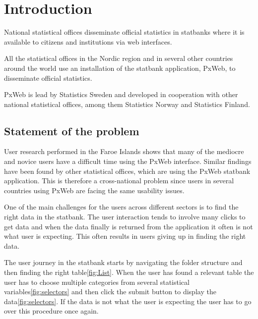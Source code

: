\chapter{Introduction}

National statistical offices disseminate official statistics in statbanks where it is available to citizens and institutions via web interfaces.
 
All the statistical offices in the Nordic region and in several other countries around the world use an installation of the statbank application, PxWeb, to disseminate official statistics.
 
PxWeb is lead by Statistics Sweden and developed in cooperation with other national statistical offices, among them Statistics Norway and Statistics Finland.

\section{Statement of the problem}
User research performed in the Faroe Islands shows that many of the mediocre and novice users have a difficult time using the PxWeb interface. Similar findings have been found by other statistical offices, which are using the PxWeb statbank application. This is therefore a cross-national problem since users in several countries using PxWeb are facing the same usability issues.
 
One of the main challenges for the users across different sectors is to find the right data in the statbank. The user interaction tends to involve many clicks to get data and when the data finally is returned from the application it often is not what user is expecting. This often results in users giving up in finding the right data.
 
The user journey in the statbank starts by navigating the folder structure and then finding the right table\ref{fig:List}. When the user has found a relevant table the user has to choose multiple categories from several statistical variables\ref{fig:selectors} and then click the submit button to display the data\ref{fig:selectors}. If the data is not what the user is expecting the user has to go over this procedure once again.

